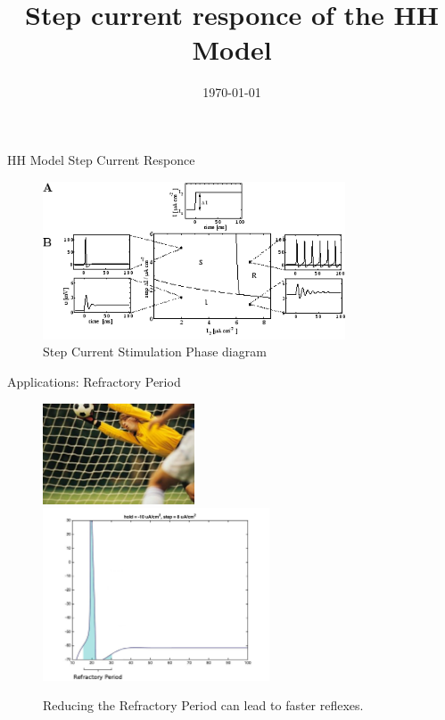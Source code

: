\documentclass{beamer}
\title[A constant current applied to the HH model produces a train of action potentials.]{Step current responce of the HH Model}
\author[E.Ioannidis \& J.Hobin] {\
   \texorpdfstring{\
        \begin{columns}
            \column{.45\linewidth}
            \centering
            Eleftherios Ioannidis\\
            \href{mailto:elefthei@mit.edu}{elefthei@mit.edu}
            \column{.45\linewidth}
            \centering
            James Hobin\\
            \href{mailto:hobinjk@mit.edu}{hobinjk@mit.edu}
        \end{columns}
   }
   {Eleftherios Ioannidis \& James Hobin}
}
\institute{MIT EECS}
\date{\today}
\begin{document}
\begin{frame}
  \titlepage{}
\end{frame}

\begin{frame}{HH Model Step Current Responce}
  \begin{figure}
    \centering
    \includegraphics[width = 0.8\textwidth]{./pictures/gerstner.png}
    \caption{Step Current Stimulation Phase diagram}
  \end{figure}
\end{frame}

\begin{frame}{Applications: Refractory Period}
  \begin{figure}
    \centering
    \includegraphics[width = 0.4\textwidth]{./pictures/reflexes.jpg}
    \includegraphics[width = 0.6\textwidth]{./pictures/refractory.jpg}
    \caption{Reducing the Refractory Period can lead to faster reflexes.}
  \end{figure}
\end{frame}
\end{document}
